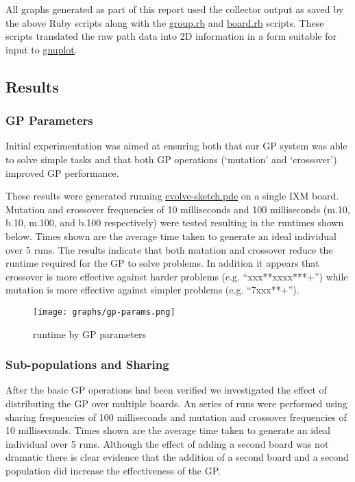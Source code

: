\documentclass[11pt]{article}
\begin{document}
All graphs generated as part of this report used the collector output
as saved by the above Ruby scripts along with the \href{file:///nfs/adaptive/eschulte/src/gp4ixm-report/src/group.rb}{group.rb} and
\href{file:///nfs/adaptive/eschulte/src/gp4ixm-report/src/board.rb}{board.rb} scripts.  These scripts translated the raw path data into 2D
information in a form suitable for input to \href{http://www.gnuplot.info/}{gnuplot}.

\subsection*{Results}
\label{sec-1.5}

\subsubsection*{GP Parameters}
\label{sec-1.5.1}

Initial experimentation was aimed at ensuring both that our GP system
was able to solve simple tasks and that both GP operations (`mutation'
and `crossover') improved GP performance.

These results were generated running \href{file:///nfs/adaptive/eschulte/src/gp4ixm-report/src/evolve-sketch.pde}{evolve-sketch.pde} on a single IXM
board.  Mutation and crossover frequencies of 10 milliseconds and 100
milliseconds (m.10, b.10, m.100, and b.100 respectively) were tested
resulting in the runtimes shown below.  Times shown are the average
time taken to generate an ideal individual over 5 runs.  The results
indicate that both mutation and crossover reduce the runtime required
for the GP to solve problems.  In addition it appears that crossover
is more effective against harder problems (e.g. ``xxx**xxxx***+'') while
mutation is more effective against simpler problems (e.g. ``7xxx**+'').



\begin{figure}[htb]
\centering
\texttt{[image: graphs/gp-params.png]}
\caption{runtime by GP parameters}
\end{figure}

\subsubsection*{Sub-populations and Sharing}
\label{sec-1.5.2}

After the basic GP operations had been verified we investigated the
effect of distributing the GP over multiple boards.  An series of runs
were performed using sharing frequencies of 100 milliseconds and
mutation and crossover frequencies of 10 milliseconds.  Times shown
are the average time taken to generate an ideal individual over 5
runs.  Although the effect of adding a second board was not dramatic
there is clear evidence that the addition of a second board and a
second population did increase the effectiveness of the GP.
\end{document}
